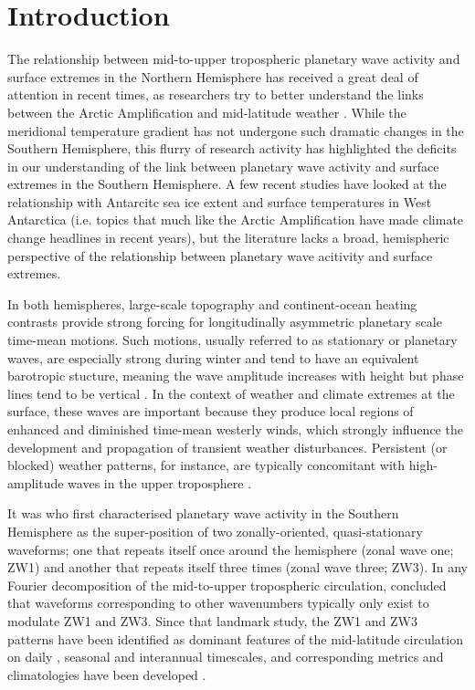 \section{Introduction}\label{s:introduction}

The relationship between mid-to-upper tropospheric planetary wave activity and surface extremes in the Northern Hemisphere has received a great deal of attention in recent times, as researchers try to better understand the links between the Arctic Amplification and mid-latitude weather \citep[e.g.][]{Cohen2014,Screen2014}. While the meridional temperature gradient has not undergone such dramatic changes in the Southern Hemisphere, this flurry of research activity has highlighted the deficits in our understanding of the link between planetary wave activity and surface extremes in the Southern Hemisphere. A few recent studies have looked at the relationship with Antarcitc sea ice extent \citep{Raphael2007,Raphael2014} and surface temperatures in West Antarctica \citep{Ding2011,Ding2013} (i.e. topics that much like the Arctic Amplification have made climate change headlines in recent years), but the literature lacks a broad, hemispheric perspective of the relationship between planetary wave acitivity and surface extremes. 

In both hemispheres, large-scale topography and continent-ocean heating contrasts provide strong forcing for longitudinally asymmetric planetary scale time-mean motions. Such motions, usually referred to as stationary or planetary waves, are especially strong during winter and tend to have an equivalent barotropic stucture, meaning the wave amplitude increases with height but phase lines tend to be vertical \citep{Holton2013}. In the context of weather and climate extremes at the surface, these waves are important because they produce local regions of enhanced and diminished time-mean westerly winds, which strongly influence the development and propagation of transient weather disturbances. Persistent (or blocked) weather patterns, for instance, are typically concomitant with high-amplitude waves in the upper troposphere \citep[e.g.][]{Trenberth1985,Renwick2005}.

It was \citet{vanLoon1972} who first characterised planetary wave activity in the Southern Hemisphere as the super-position of two zonally-oriented, quasi-stationary waveforms; one that repeats itself once around the hemisphere (zonal wave one; ZW1) and another that repeats itself three times (zonal wave three; ZW3). In any Fourier decomposition of the mid-to-upper tropospheric circulation, \citet{vanLoon1972} concluded that waveforms corresponding to other wavenumbers typically only exist to modulate ZW1 and ZW3. Since that landmark study, the ZW1 and ZW3 patterns have been identified as dominant features of the mid-latitude circulation on daily \citep[e.g.][]{Kidson1988}, seasonal \citep[e.g.][]{Mo1985} and interannual \citep[e.g.][]{Karoly1989} timescales, and corresponding metrics and climatologies have been developed \citep{Raphael2004,Hobbs2007}.

